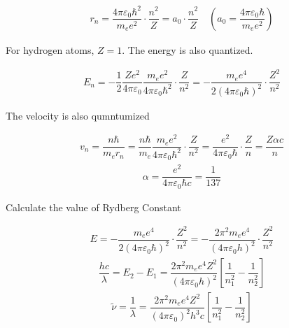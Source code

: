 \begin{equation}
  \begin{aligned}
    r_n = \dfrac{4 \pi \varepsilon_0 \hbar^2}{m_e e^2} \cdot \dfrac{n^2}{Z} = a_0 \cdot \dfrac{n^2}{Z} \quad \left( a_0 = \dfrac{4 \pi \varepsilon_0 \hbar}{m_e e^2}  \right)
  \end{aligned}
\end{equation}

For hydrogen atoms, $Z = 1$. The energy is also quantized.

\begin{equation*}
  \begin{aligned}
    E_n = - \dfrac{1}{2} \dfrac{Z e^2}{4 \pi \varepsilon_0} \dfrac{m_e e^2}{4 \pi \varepsilon_0 \hbar^2} \cdot \dfrac{Z}{n^2} = - \dfrac{m_e e^4}{2 \left( 4 \pi \varepsilon_0 \hbar \right)^2} \cdot \dfrac{Z^2}{n^2} 
  \end{aligned}
\end{equation*}

The velocity is also qumntumized

\begin{equation*}
  \begin{aligned}
    v_n = \dfrac{n \hbar}{m_e r_n} = \dfrac{n \hbar}{m_e}  \dfrac{m_e e^2}{4 \pi \varepsilon_0 \hbar^2} \cdot \dfrac{Z}{n^2} = \dfrac{e^2}{4 \pi \varepsilon_0 \hbar} \cdot \dfrac{Z}{n} =
\dfrac{Z \alpha c}{n} 
  \end{aligned}
\end{equation*}
\begin{equation*}
  \begin{aligned}
    \alpha = \dfrac{e^2}{4 \pi \varepsilon_0 \hbar c} = \dfrac{1}{137}  
  \end{aligned}
\end{equation*}

Calculate the value of Rydberg Constant

\begin{equation*}
  \begin{aligned}
    E = - \dfrac{m_e e^4}{2 \left( 4 \pi \varepsilon_0 \hbar \right)^2} \cdot \dfrac{Z^2}{n^2} = - \dfrac{2 \pi^2 m_e e^4}{\left( 4 \pi \varepsilon_0 h \right)^2} \cdot \dfrac{Z^2}{n^2}
  \end{aligned}
\end{equation*}
\begin{equation*}
  \begin{aligned}
    \dfrac{h c}{\lambda} = E_2 - E_1 =  \dfrac{2 \pi^2 m_e e^4 Z^2}{\left( 4 \pi \varepsilon_0 h \right)^2} \left[ \dfrac{1}{n_1^2} - \dfrac{1}{n_2^2}   \right]
  \end{aligned}
\end{equation*}
\begin{equation*}
  \begin{aligned}
    \tilde{\nu} = \dfrac{1}{\lambda} = \dfrac{2 \pi^2 m_e e^4 Z^2}{\left( 4 \pi \varepsilon_0 \right)^2 h^3 c} \left[ \dfrac{1}{n_1^2} - \dfrac{1}{n_2^2}   \right]
  \end{aligned}
\end{equation*}

